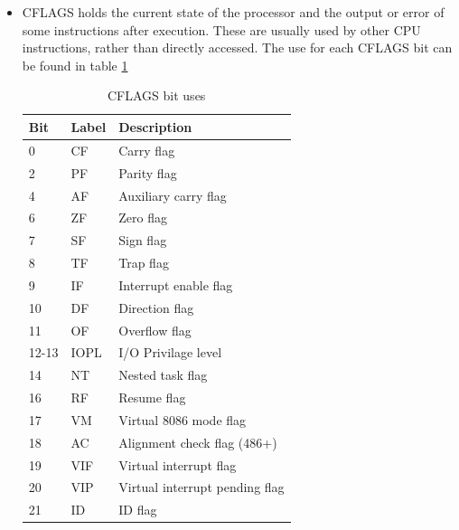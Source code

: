\begin{itemize}
\begin{itemize}
						\end{itemize}
					\item CFLAGS holds the current state of the processor and the output or error of some instructions after execution.
						These are usually used by other CPU instructions, rather than directly accessed.
						The use for each CFLAGS bit can be found in table \ref{tab:CFLAGSBits}
						\begin{table}[htb]
							\centering
				\begin{adjustbox}{max width=1\textwidth}
							\begin{tabular}{lll}
								\toprule
								\textbf{Bit} &  \textbf{Label} &   \textbf{Description} \\
								\toprule
								0   &   CF &     Carry flag \\
								2   &   PF   &   Parity flag \\
								4   &   AF   &   Auxiliary carry flag \\
								6   &   ZF   &   Zero flag \\
								7   &   SF   &   Sign flag \\
								8   &   TF   &   Trap flag \\
								9   &   IF   &   Interrupt enable flag \\
								10  &   DF   &   Direction flag \\
								11  &   OF   &   Overflow flag \\
								12-13 & IOPL &   I/O Privilage level \\
								14  &   NT   &   Nested task flag \\
								16  &   RF   &   Resume flag \\
								17  &   VM   &   Virtual 8086 mode flag \\
								18  &   AC   &   Alignment check flag (486+) \\
								19  &   VIF  &   Virtual interrupt flag \\
								20  &   VIP  &   Virtual interrupt pending flag \\
								21  &   ID   &   ID flag \\
								\bottomrule
						\end{tabular}
					\end{adjustbox}
						\caption{CFLAGS bit uses}
						\label{tab:CFLAGSBits}
					\end{table}
				\end{itemize}

